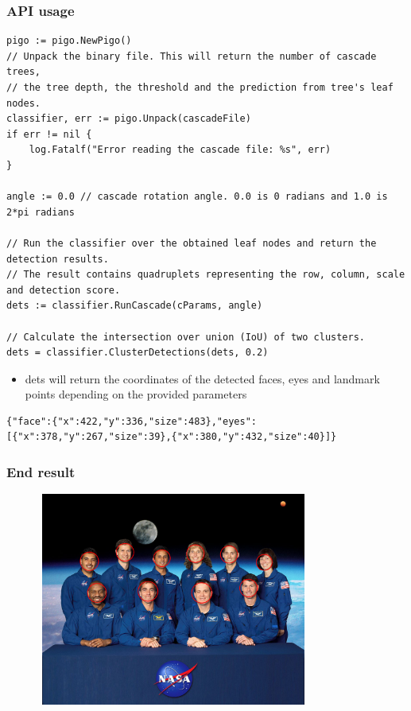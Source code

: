 \documentclass[9pt]{beamer}
\begin{document}
\begin{frame}[fragile]
\frametitle{API usage}



\begin{verbatim}
pigo := pigo.NewPigo()
// Unpack the binary file. This will return the number of cascade trees,
// the tree depth, the threshold and the prediction from tree's leaf nodes.
classifier, err := pigo.Unpack(cascadeFile)
if err != nil {
    log.Fatalf("Error reading the cascade file: %s", err)
}

angle := 0.0 // cascade rotation angle. 0.0 is 0 radians and 1.0 is 2*pi radians

// Run the classifier over the obtained leaf nodes and return the detection results.
// The result contains quadruplets representing the row, column, scale and detection score.
dets := classifier.RunCascade(cParams, angle)

// Calculate the intersection over union (IoU) of two clusters.
dets = classifier.ClusterDetections(dets, 0.2)

\end{verbatim}


\begin{itemize}
\item dets will return the coordinates of the detected faces, eyes and landmark points depending on the provided parameters
\end{itemize}


\begin{verbatim}
{"face":{"x":422,"y":336,"size":483},"eyes":[{"x":378,"y":267,"size":39},{"x":380,"y":432,"size":40}]}

\end{verbatim}



\end{frame}

\begin{frame}[fragile]
\frametitle{End result}


\begin{figure}[h]
\begin{center}
\includegraphics[width=9cm,height=7cm]{assets/pigo_clustering-1024x819.png}
\end{center}

\end{figure}


\end{frame}
\end{document}
